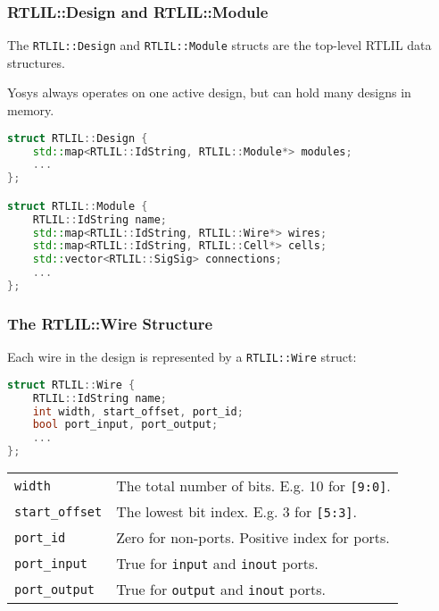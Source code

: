 \subsubsection{RTLIL::Design and RTLIL::Module}

\begin{frame}[t, fragile]{\subsubsecname}
The {\tt RTLIL::Design} and {\tt RTLIL::Module} structs are the top-level RTLIL
data structures.

Yosys always operates on one active design, but can hold many designs in memory.

\bigskip
\begin{lstlisting}[xleftmargin=1cm, basicstyle=\ttfamily\fontsize{8pt}{10pt}\selectfont, language=C++]
struct RTLIL::Design {
    std::map<RTLIL::IdString, RTLIL::Module*> modules;
    ...
};

struct RTLIL::Module {
    RTLIL::IdString name;
    std::map<RTLIL::IdString, RTLIL::Wire*> wires;
    std::map<RTLIL::IdString, RTLIL::Cell*> cells;
    std::vector<RTLIL::SigSig> connections;
    ...
};
\end{lstlisting}
\end{frame}

\subsubsection{The RTLIL::Wire Structure}

\begin{frame}[t, fragile]{\subsubsecname}
Each wire in the design is represented by a {\tt RTLIL::Wire} struct:

\medskip
\begin{lstlisting}[xleftmargin=1cm, basicstyle=\ttfamily\fontsize{8pt}{10pt}\selectfont, language=C++]
struct RTLIL::Wire {
    RTLIL::IdString name;
    int width, start_offset, port_id;
    bool port_input, port_output;
    ...
};
\end{lstlisting}

\medskip
\hfil\begin{tabular}{p{3cm}l}
{\tt width} \dotfill & The total number of bits. E.g. 10 for {\tt [9:0]}. \\
{\tt start\_offset} \dotfill & The lowest bit index. E.g. 3 for {\tt [5:3]}. \\
{\tt port\_id} \dotfill & Zero for non-ports. Positive index for ports. \\
{\tt port\_input} \dotfill & True for {\tt input} and {\tt inout} ports. \\
{\tt port\_output} \dotfill & True for {\tt output} and {\tt inout} ports. \\
\end{tabular}
\end{frame}

